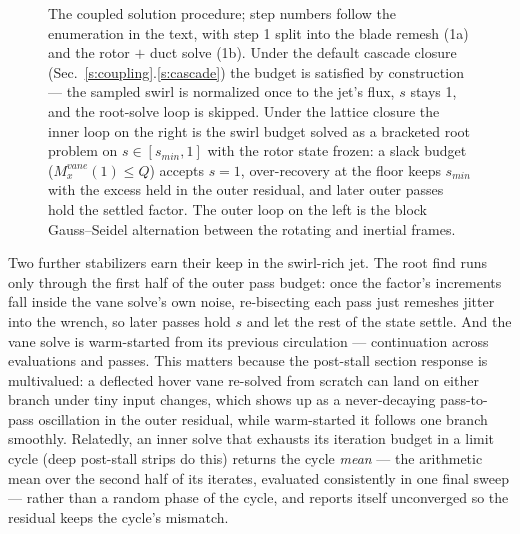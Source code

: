 \documentclass[]{aiaa-tc}%
\begin{document}
\begin{figure}[p]
 \caption{The coupled solution procedure; step numbers follow the
   enumeration in the text, with step 1 split into the blade remesh
   (1a) and the rotor $+$ duct solve (1b). Under the default cascade
   closure (Sec.~\ref{s:coupling}.\ref{s:cascade}) the budget is
   satisfied by construction --- the sampled swirl is normalized once to the jet's
   flux, $s$ stays 1, and the root-solve loop is skipped. Under the
   lattice closure the inner loop on the right is the swirl budget
   solved as a bracketed root problem on $s \in [s_{min}, 1]$ with the
   rotor state frozen: a slack budget ($M_x^{vane}(1) \le Q$) accepts
   $s = 1$, over-recovery at the floor keeps $s_{min}$ with the excess
   held in the outer residual, and later outer passes hold the settled
   factor. The outer loop on the left is the block Gauss--Seidel
   alternation between the rotating and inertial frames.}
 \label{f:flowchart}
\end{figure}

Two further stabilizers earn their keep in the swirl-rich jet. The
root find runs only through the first half of the outer pass budget:
once the factor's increments fall inside the vane solve's own noise,
re-bisecting each pass just remeshes jitter into the wrench, so later
passes hold $s$ and let the rest of the state settle. And the vane
solve is warm-started from its previous circulation --- continuation
across evaluations and passes. This matters because the post-stall
section response is multivalued: a deflected hover vane re-solved from
scratch can land on either branch under tiny input changes, which
shows up as a never-decaying pass-to-pass oscillation in the outer
residual, while warm-started it follows one branch smoothly.
Relatedly, an inner solve that exhausts its iteration budget in a
limit cycle (deep post-stall strips do this) returns the cycle
\emph{mean} --- the arithmetic mean over the second half of its
iterates, evaluated consistently in one final sweep --- rather than a
random phase of the cycle, and reports itself unconverged so the
residual keeps the cycle's mismatch.
\end{document}
